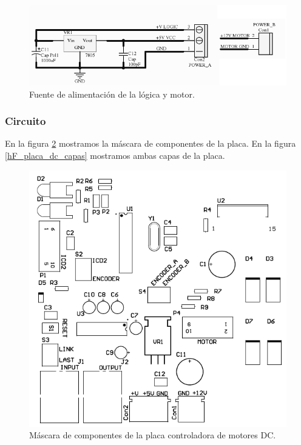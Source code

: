 \begin{figure}
	\centering
	\includegraphics[scale=.3]{figuras/dc_schemaFuente.png}
	\caption{Fuente de alimentaci\'on de la l\'ogica y motor.}
	\label{hF_placa_dc_schema5}
\end{figure}

\subsubsection{Circuito}
\label{h_placas_motorDC_circuito}

En la figura \ref{hF_placa_dc_componentes} mostramos la m\'ascara de componentes de la placa.
En la figura \ref{hF_placa_dc_capas} mostramos ambas capas de la placa.

\begin{figure}
	\centering
	\includegraphics[scale=.3]{figuras/dc_componentes.png}
	\caption{M\'ascara de componentes de la placa controladora de motores DC.}
	\label{hF_placa_dc_componentes}
\end{figure}

